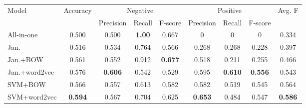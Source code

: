 \documentclass[11pt]{article}
\begin{document}
\begin{table}
\begin{center}
\small
\setlength{\tabcolsep}{2pt}
\begin{tabular}{|l|c|ccc|cccc|}
\hline

\multirow{2}{*}{Model} & \multirow{2}{*}{Accuracy} & \multicolumn{3}{|c|}{Negative} & \multicolumn{3}{|c|}{Positive} & \multirow{2}{*}{Avg. F}\\
\cline{3-8}
& & \multicolumn{1}{|c|}{Precision} & \multicolumn{1}{|c|}{Recall} & \multicolumn{1}{|c|}{F-score} & \multicolumn{1}{|c|}{Precision} & \multicolumn{1}{|c|}{Recall} & \multicolumn{1}{|c|}{F-score} & \\
\hline
All-in-one & \multicolumn{1}{|c|}{0.500} & \multicolumn{1}{|c|}{0.500} & \multicolumn{1}{|c|}{\textbf{1.00}} & \multicolumn{1}{|c|}{0.667} & \multicolumn{1}{|c|}{0} & \multicolumn{1}{|c|}{0} & \multicolumn{1}{|c|}{0} & \multicolumn{1}{|c|}{0.334}\\
Jan.& \multicolumn{1}{|c|}{0.516} &\multicolumn{1}{|c|}{0.534} & \multicolumn{1}{|c|}{0.764} &\multicolumn{1}{|c|}{0.566} &\multicolumn{1}{|c|}{0.268}&\multicolumn{1}{|c|}{0.268}& \multicolumn{1}{|c|}{0.228} & \multicolumn{1}{|c|}{0.397}\\
Jan.+BOW&\multicolumn{1}{|c|}{0.561}  &\multicolumn{1}{|c|}{0.552} & \multicolumn{1}{|c|}{0.912}&\multicolumn{1}{|c|}{\textbf{0.677}} & \multicolumn{1}{|c|}{0.518}&\multicolumn{1}{|c|}{0.211} & \multicolumn{1}{|c|}{0.255} & \multicolumn{1}{|c|}{0.466}\\
Jan.+word2vec&\multicolumn{1}{|c|}{0.576} &\multicolumn{1}{|c|}{\textbf{0.606}} &\multicolumn{1}{|c|}{0.542} &\multicolumn{1}{|c|}{0.529} &\multicolumn{1}{|c|}{0.595}&\multicolumn{1}{|c|}{\textbf{0.610}} & \multicolumn{1}{|c|}{\textbf{0.556}} &\multicolumn{1}{|c|}{0.543} \\
SVM+BOW &\multicolumn{1}{|c|}{0.566} &\multicolumn{1}{|c|}{0.557} &\multicolumn{1}{|c|}{0.613} & \multicolumn{1}{|c|}{0.582}& \multicolumn{1}{|c|}{0.582}& \multicolumn{1}{|c|}{0.519} & \multicolumn{1}{|c|}{0.545} & \multicolumn{1}{|c|}{0.564}\\
SVM+word2vec&\multicolumn{1}{|c|}{\textbf{0.594}}  &\multicolumn{1}{|c|}{0.567} &\multicolumn{1}{|c|}{0.704} &\multicolumn{1}{|c|}{0.625}& \multicolumn{1}{|c|}{\textbf{0.653}}& \multicolumn{1}{|c|}{0.484} & \multicolumn{1}{|c|}{0.547} & \multicolumn{1}{|c|}{\textbf{0.586}}\\

\end{tabular}
\end{center}
\end{table}
\end{document}
